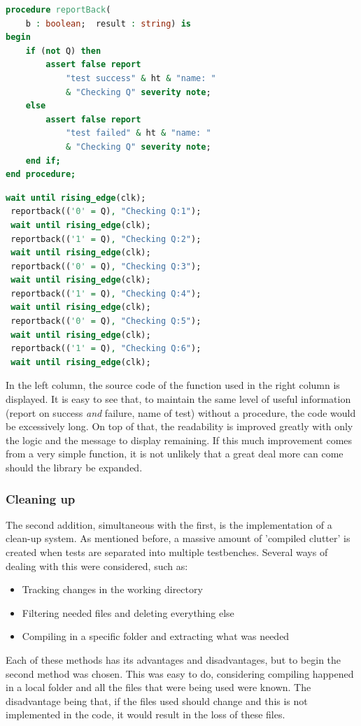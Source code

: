 \documentclass[11pt,british]{article}
\begin{document}
\begin{multicols}{2}
\begin{lstlisting}[language=VHDL, tabsize=4, frame=single, framesep=2mm, belowskip=8pt, aboveskip=8pt, showstringspaces=false, basicstyle=\footnotesize]
procedure reportBack(
	b : boolean;  result : string) is
begin
	if (not Q) then
		assert false report
			"test success" & ht & "name: "
			& "Checking Q" severity note;
	else
		assert false report
			"test failed" & ht & "name: "
			& "Checking Q" severity note;
	end if;
end procedure;
\end{lstlisting}
\columnbreak
\begin{lstlisting}[language=VHDL, tabsize=4, frame=single, framesep=2mm, belowskip=8pt, aboveskip=8pt, showstringspaces=false, basicstyle=\footnotesize]
 wait until rising_edge(clk);
 reportback(('0' = Q), "Checking Q:1");
 wait until rising_edge(clk);
 reportback(('1' = Q), "Checking Q:2");
 wait until rising_edge(clk);
 reportback(('0' = Q), "Checking Q:3");
 wait until rising_edge(clk);
 reportback(('1' = Q), "Checking Q:4");
 wait until rising_edge(clk);
 reportback(('0' = Q), "Checking Q:5");
 wait until rising_edge(clk);
 reportback(('1' = Q), "Checking Q:6");
 wait until rising_edge(clk);
\end{lstlisting}
\end{multicols}
In the left column, the source code of the function used in the right column is displayed. It is easy to see that, to maintain the same level of useful information (report on success \emph{and} failure, name of test) without a procedure, the code would be excessively long. On top of that, the readability is improved greatly with only the logic and the message to display remaining. If this much improvement comes from a very simple function, it is not unlikely that a great deal more can come should the library be expanded.

\subsubsection{Cleaning up}
The second addition, simultaneous with the first, is the implementation of a clean-up system. As mentioned before, a massive amount of 'compiled clutter' is created when tests are separated into multiple testbenches. Several ways of dealing with this were considered, such as:
\begin{itemize}
\item Tracking changes in the working directory
\item Filtering needed files and deleting everything else
\item Compiling in a specific folder and extracting what was needed
\end{itemize}
Each of these methods has its advantages and disadvantages, but to begin the second method was chosen. This was easy to do, considering compiling happened in a local folder and all the files that were being used were known. The disadvantage being that, if the files used should change and this is not implemented in the code, it would result in the loss of these files.
\end{document}
